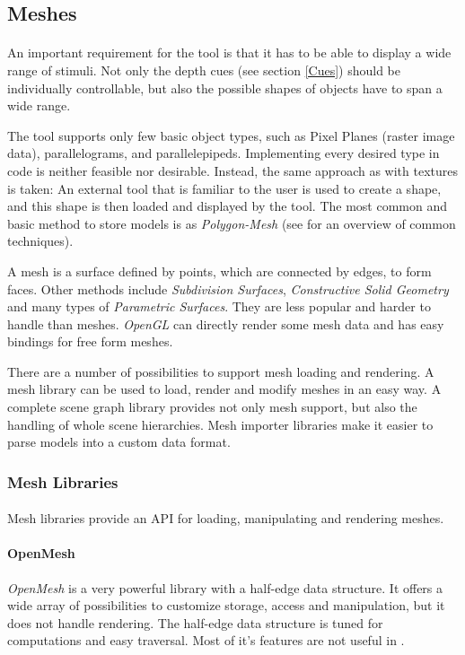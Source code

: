 \subsection{Meshes\label{Meshes}}
\paragraph{}
An important requirement for the tool is that it has to be able to display a wide range of stimuli.
Not only the depth cues (see section \ref{Cues}) should be individually controllable, but also the possible shapes of objects have to span a wide range.

The tool supports only few basic object types, such as Pixel Planes (raster image data), parallelograms, and parallelepipeds. Implementing every desired type in code is neither feasible nor desirable.
Instead, the same approach as with textures is taken: An external tool that is familiar to the user is used to create a shape, and this shape is then loaded and displayed by the tool.
The most common and basic method to store models is as \textit{Polygon-Mesh} (see \cite{MeshPop} for an overview of common techniques).

A mesh is a surface defined by points, which are connected by edges, to form faces. Other methods include \textit{Subdivision Surfaces}, \textit{Constructive Solid Geometry} and many types of \textit{Parametric Surfaces}.
They are less popular and harder to handle than meshes.
\textit{OpenGL} can directly render some mesh data and has easy bindings for free form meshes.

There are a number of possibilities to support mesh loading and rendering.
A mesh library can be used to load, render and modify meshes in an easy way.
A complete scene graph library provides not only mesh support, but also the handling of whole scene hierarchies.
Mesh importer libraries make it easier to parse models into a custom data format.


\subsubsection{Mesh Libraries}
\paragraph{}
Mesh libraries provide an API for loading, manipulating and rendering meshes.

\paragraph{OpenMesh}
\textit{OpenMesh} is a very powerful library with a half-edge data structure.
It offers a wide array of possibilities to customize storage, access and manipulation,
but it does not handle rendering.
The half-edge data structure is tuned for computations and easy traversal.
Most of it's features are not useful in \ER.

